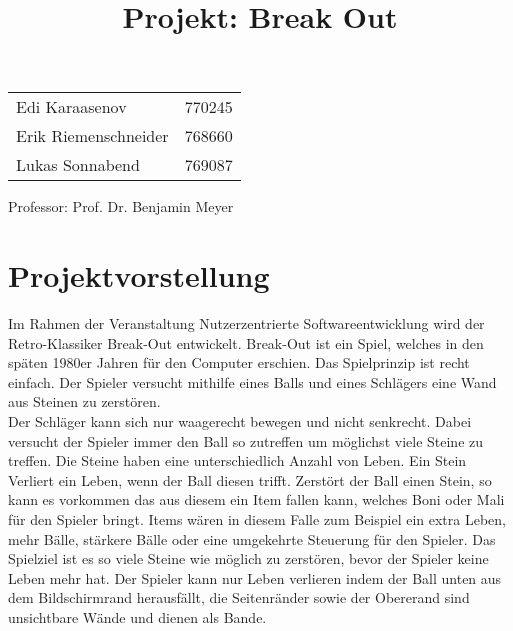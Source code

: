 \documentclass[12pt, a4paper]{article}
\begin{document}
\title{Projekt: Break Out}
\date{}
\maketitle
\thispagestyle{empty}
\begin{center}

\begin{table}[H]
\begin{center}
\begin{tabular}[h]{l l}

Edi Karaasenov & 770245\\
Erik Riemenschneider & 768660\\
Lukas Sonnabend & 769087\\

\end{tabular}
\end{center}
\end{table}


\vspace*{\fill}
Professor: Prof. Dr. Benjamin Meyer\\
\end{center}

\newpage
\tableofcontents
\newpage
\section{Projektvorstellung}
Im Rahmen der Veranstaltung Nutzerzentrierte Softwareentwicklung wird der Retro-Klassiker Break-Out entwickelt. Break-Out ist ein Spiel, welches in den späten 1980er Jahren für den Computer erschien.\newline\newline
Das Spielprinzip ist recht einfach. Der Spieler versucht mithilfe eines Balls und eines Schlägers eine Wand aus Steinen zu zerstören.\\
Der Schläger kann sich nur waagerecht bewegen und nicht senkrecht.
Dabei versucht der Spieler immer den Ball so zutreffen um möglichst viele Steine zu treffen. Die Steine haben eine unterschiedlich Anzahl von Leben. Ein Stein Verliert ein Leben, wenn der Ball diesen trifft. Zerstört der Ball einen Stein, so kann es vorkommen das aus diesem ein Item fallen kann, welches Boni oder Mali für den Spieler bringt. Items wären in diesem Falle zum Beispiel ein extra Leben, mehr Bälle, stärkere Bälle oder eine umgekehrte Steuerung für den Spieler.\newline\newline
Das Spielziel ist es so viele Steine wie möglich zu zerstören, bevor der Spieler keine Leben mehr hat. Der Spieler kann nur Leben verlieren indem der Ball unten aus dem Bildschirmrand herausfällt, die Seitenränder sowie der Obererand sind unsichtbare Wände und dienen als Bande.  
\newpage
\end{document}
